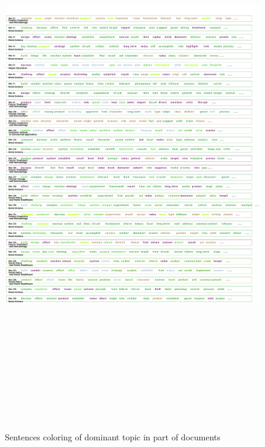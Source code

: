%
%
\begin{figure}[H]
    \centering
    \includegraphics[width = 17cm, height = 24cm]{./img/sentences.pdf}
    \caption{Sentences coloring of dominant topic in part of documents}
\end{figure}
%
%


% 
% 

% 
